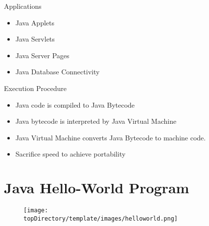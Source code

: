\documentclass[10pt, compress]{beamer}
\begin{document}
\begin{slide}
	\begin{block}{Applications}
		\begin{itemize}
			\item[] Java Applets
			\item[] Java Servlets
			\item[] Java Server Pages
			\item[] Java Database Connectivity
		\end{itemize}
	\end{block}
\end{slide}

\begin{slide}
	\begin{block}{Execution Procedure}
		\begin{itemize}
			\item[] Java code is compiled to Java Bytecode
			\item[] Java bytecode is interpreted by Java Virtual Machine
			\item[] Java Virtual Machine converts Java Bytecode to machine code.
			\item[] Sacrifice speed to achieve portability
		\end{itemize}
	\end{block}
\end{slide}

\section{Java Hello-World Program}

\begin{slide}
	\begin{figure}
		\texttt{[image: \\topDirectory/template/images/helloworld.png]}
	\end{figure}
\end{slide}
\end{document}
